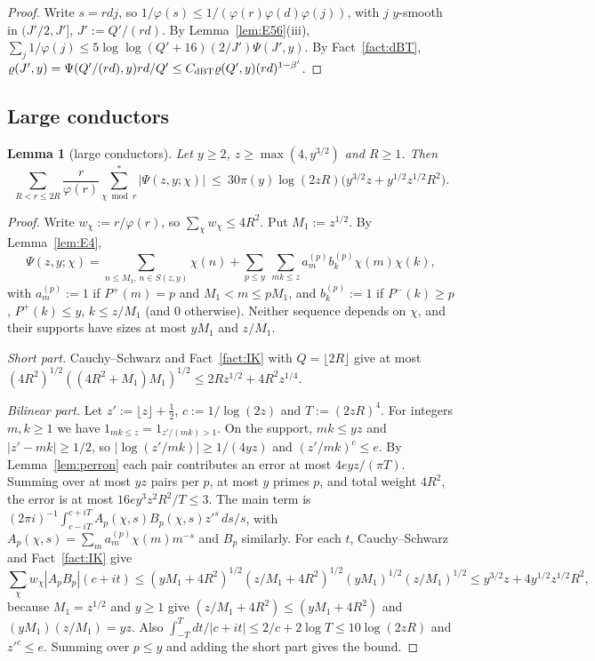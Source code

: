 \documentclass[11pt]{amsart}
\newtheorem{lemma}[theorem]{Lemma}
\theoremstyle{definition}
\newcommand{\Pp}{P^{+}}
\begin{document}
\begin{proof}
Write $s=rdj$, so $1/\varphi(s)\le1/(\varphi(r)\varphi(d)\varphi(j))$, with $j$ $y$-smooth in $(J'/2,J']$, $J':=Q'/(rd)$. By
Lemma~\ref{lem:E56}(iii), $\sum_j1/\varphi(j)\le5\log\log(Q'+16)(2/J')\Psi(J',y)$. By Fact~\ref{fact:dBT},
$\varrho(J',y)=\Psi(Q'/(rd),y)rd/Q'\le C_{\rm dBT}\varrho(Q',y)(rd)^{1-\beta'}$.
\end{proof}

\subsection{Large conductors}

\begin{lemma}[large conductors]\label{lem:LS}
Let $y\ge2$, $z\ge\max(4,y^{3/2})$ and $R\ge1$. Then
\[
\sum_{R<r\le2R}\frac r{\varphi(r)}\sum^*_{\chi\bmod r}|\Psi(z,y;\chi)|\ \le\ 30\pi(y)\log(2zR)\bigl(y^{3/2}z+y^{1/2}z^{1/2}R^2\bigr).
\]
\end{lemma}

\begin{proof}
Write $w_\chi:=r/\varphi(r)$, so $\sum_\chi w_\chi\le4R^2$. Put $M_1:=z^{1/2}$. By Lemma~\ref{lem:E4},
\[
\Psi(z,y;\chi)=\sum_{n\le M_1,\,n\in S(z,y)}\chi(n)+\sum_{p\le y}\ \sum_{mk\le z}a^{(p)}_mb^{(p)}_k\chi(m)\chi(k),
\]
with $a^{(p)}_m:=1$ if $\Pp(m)=p$ and $M_1<m\le pM_1$, and $b^{(p)}_k:=1$ if $P^-(k)\ge p$, $\Pp(k)\le y$, $k\le z/M_1$ (and $0$ otherwise).
Neither sequence depends on $\chi$, and their supports have sizes at most $yM_1$ and $z/M_1$.

\emph{Short part.} Cauchy--Schwarz and Fact~\ref{fact:IK} with $Q=\lfloor2R\rfloor$ give at most
$(4R^2)^{1/2}((4R^2+M_1)M_1)^{1/2}\le2Rz^{1/2}+4R^2z^{1/4}$.

\emph{Bilinear part.} Let $z':=\lfloor z\rfloor+\frac12$, $c:=1/\log(2z)$ and $T:=(2zR)^4$. For integers $m,k\ge1$ we have $1_{mk\le z}=1_{z'/(mk)>1}$.
On the support, $mk\le yz$ and $|z'-mk|\ge1/2$, so $|\log(z'/mk)|\ge1/(4yz)$ and $(z'/mk)^c\le e$. By Lemma~\ref{lem:perron} each pair contributes an
error at most $4eyz/(\pi T)$. Summing over at most $yz$ pairs per $p$, at most $y$ primes $p$, and total weight $4R^2$, the error is
at most $16ey^3z^2R^2/T\le3$. The main term is $(2\pi i)^{-1}\int_{c-iT}^{c+iT}A_p(\chi,s)B_p(\chi,s)z'^s\,ds/s$, with
$A_p(\chi,s)=\sum_ma^{(p)}_m\chi(m)m^{-s}$ and $B_p$ similarly. For each $t$, Cauchy--Schwarz and Fact~\ref{fact:IK} give
\[
\sum_\chi w_\chi|A_pB_p|(c+it)\le(yM_1+4R^2)^{1/2}(z/M_1+4R^2)^{1/2}(yM_1)^{1/2}(z/M_1)^{1/2}\le y^{3/2}z+4y^{1/2}z^{1/2}R^2 ,
\]
because $M_1=z^{1/2}$ and $y\ge1$ give $(z/M_1+4R^2)\le(yM_1+4R^2)$ and $(yM_1)(z/M_1)=yz$.
Also $\int_{-T}^T dt/|c+it|\le2/c+2\log T\le10\log(2zR)$ and $z'^c\le e$. Summing over $p\le y$ and adding the short part gives the bound.
\end{proof}
\end{document}
